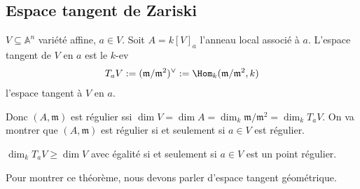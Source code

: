         \subsection{Espace tangent de Zariski}
            \begin{defi}
                $V \subseteq \mathbb{A}^n$ variété affine, $a \in V$. Soit $A = k[V]_a$ l'anneau local associé à $a$. L'espace tangent de $V$ en $a$ est le $k$-ev
                \begin{align*}
                    T_aV := (\mathfrak{m}/ \mathfrak{m}^2)^{\vee} := \Hom_k(\mathfrak{m}/ \mathfrak{m}^2, k)
                \end{align*}
                l'espace tangent à $V$ en $a$.
            \end{defi}
            \begin{theo}
            \end{theo}
            Donc $(A, \mathfrak{m})$ est régulier ssi $\dim V =\dim A = \dim_k \mathfrak{m}/ \mathfrak{m}^2 = \dim_k T_aV$. On va montrer que $(A, \mathfrak{m})$ est régulier si et seulement si $a \in V$ est régulier.
            \begin{theo}
                $\dim_k T_aV \geq \dim V$ avec égalité si et seulement si $a \in V$ est un point régulier.
            \end{theo}
            Pour montrer ce théorème, nous devons parler d'espace tangent géométrique.
        
